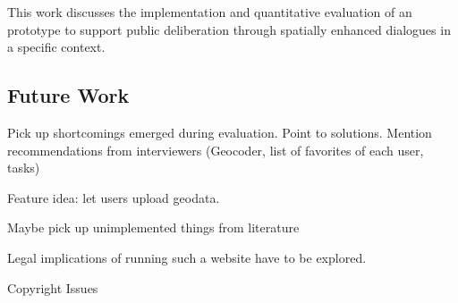 

This work discusses the implementation and quantitative evaluation of an prototype to support public deliberation through spatially enhanced dialogues in a specific context.

\subsection{Future Work}
Pick up shortcomings emerged during evaluation. Point to solutions. Mention recommendations from interviewers (Geocoder, list of favorites of each user, tasks)

Feature idea: let users upload geodata.

Maybe pick up unimplemented things from literature

Legal implications of running such a website have to be explored.

Copyright Issues \cite{Carver2001_PPGIS_Cyberdemocracy}